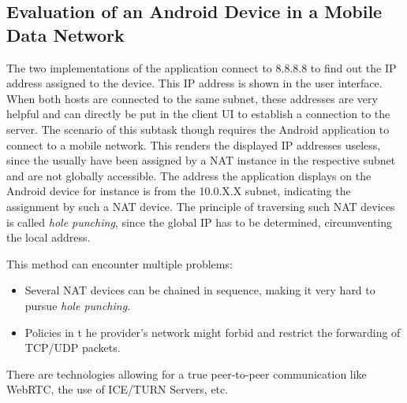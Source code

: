 \subsection{Evaluation of an Android Device in a Mobile Data Network}
The two implementations of the application connect to 8.8.8.8 to find out the IP address assigned to the device. This IP address is shown in the user interface. When both hosts are connected to the same subnet, these addresses are very helpful and can directly be put in the client UI to establish a connection to the server. The scenario of this subtask though requires the Android application to connect to a mobile network. This renders the displayed IP addresses useless, since the usually have been assigned by a NAT instance in the respective subnet and are not globally accessible. The address the application displays on the Android device for instance is from the 10.0.X.X subnet, indicating the assignment by such a NAT device. The principle of traversing such NAT devices is called \textit{hole punching}, since the global IP has to be determined, circumventing the local address. 

This method can encounter multiple problems: 
\begin{itemize}
	\item Several NAT devices can be chained in sequence, making it very hard to pursue \textit{hole punching}.
	\item Policies in t he provider's network might forbid and restrict the forwarding of TCP/UDP packets. 
\end{itemize}

There are technologies allowing for a true peer-to-peer communication like WebRTC, the use of ICE/TURN Servers, etc.